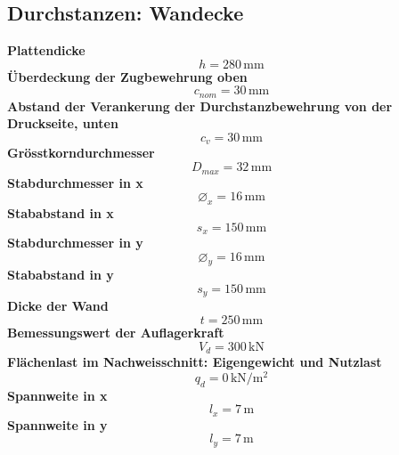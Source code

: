 \documentclass[11pt,a4paper]{article}
\begin{document}
\subsection{Durchstanzen: Wandecke}
\noindent\textbf{Plattendicke}
\begin{equation*}
h = 280\,\mathrm{mm}
\end{equation*}
\noindent\textbf{Überdeckung der Zugbewehrung oben}
\begin{equation*}
c_{nom} = 30\,\mathrm{mm}
\end{equation*}
\noindent\textbf{Abstand der Verankerung der Durchstanzbewehrung von der Druckseite, unten}
\begin{equation*}
c_v = 30\,\mathrm{mm}
\end{equation*}
\noindent\textbf{Grösstkorndurchmesser}
\begin{equation*}
D_{max} = 32\,\mathrm{mm}
\end{equation*}
\noindent\textbf{Stabdurchmesser in x}
\begin{equation*}
\varnothing_x = 16\,\mathrm{mm}
\end{equation*}
\noindent\textbf{Stababstand in x}
\begin{equation*}
s_x = 150\,\mathrm{mm}
\end{equation*}
\noindent\textbf{Stabdurchmesser in y}
\begin{equation*}
\varnothing_y = 16\,\mathrm{mm}
\end{equation*}
\noindent\textbf{Stababstand in y}
\begin{equation*}
s_y = 150\,\mathrm{mm}
\end{equation*}
\noindent\textbf{Dicke der Wand}
\begin{equation*}
t = 250\,\mathrm{mm}
\end{equation*}
\noindent\textbf{Bemessungswert der Auflagerkraft}
\begin{equation*}
V_d = 300\,\mathrm{kN}
\end{equation*}
\noindent\textbf{Flächenlast im Nachweisschnitt: Eigengewicht und Nutzlast}
\begin{equation*}
q_d = 0\,\mathrm{kN}/\mathrm{m}^{2}
\end{equation*}
\noindent\textbf{Spannweite in x}
\begin{equation*}
l_x = 7\,\mathrm{m}
\end{equation*}
\noindent\textbf{Spannweite in y}
\begin{equation*}
l_y = 7\,\mathrm{m}
\end{equation*}
\end{document}
